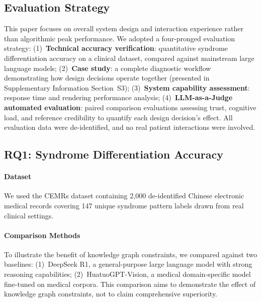 
\subsection{Evaluation Strategy}\label{sec:eval-strategy}

This paper focuses on overall system design and interaction experience rather than algorithmic peak performance.
We adopted a four-pronged evaluation strategy:
(1)~\textbf{Technical accuracy verification}: quantitative syndrome differentiation accuracy on a clinical dataset, compared against mainstream large language models;
(2)~\textbf{Case study}: a complete diagnostic workflow demonstrating how design decisions operate together (presented in Supplementary Information Section~S3);
(3)~\textbf{System capability assessment}: response time and rendering performance analysis;
(4)~\textbf{LLM-as-a-Judge automated evaluation}: paired comparison evaluations assessing trust, cognitive load, and reference credibility to quantify each design decision's effect.
All evaluation data were de-identified, and no real patient interactions were involved.

\subsection{RQ1: Syndrome Differentiation Accuracy}\label{sec:eval-accuracy}

\paragraph{Dataset}
We used the CEMRs dataset containing 2,000 de-identified Chinese electronic medical records covering 147 unique syndrome pattern labels drawn from real clinical settings.

\paragraph{Comparison Methods}
To illustrate the benefit of knowledge graph constraints, we compared against two baselines:
(1)~DeepSeek R1\cite{58}, a general-purpose large language model with strong reasoning capabilities;
(2)~HuatuoGPT-Vision\cite{62}, a medical domain-specific model fine-tuned on medical corpora.
This comparison aims to demonstrate the effect of knowledge graph constraints, not to claim comprehensive superiority.

